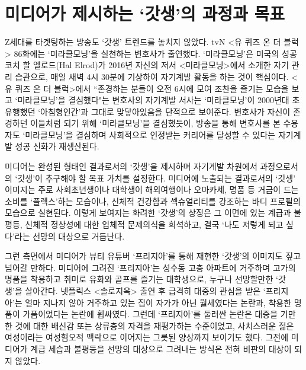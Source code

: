 \section*{미디어가 제시하는 `갓생'의 과정과 목표}

Z세대를 타겟팅하는 방송도 `갓생' 트렌드를 놓치지 않았다. tvN <유 퀴즈 온 더 블럭> 86화에는 `미라클모닝'을 실천하는 변호사가 출연했다. `미라클모닝'은 미국의 성공 코치 할 엘로드(Hal Elrod)가 2016년 자신의 저서 <미라클모닝>에서 소개한 자기 관리 습관으로, 매일 새벽 4시 30분에 기상하여 자기계발 활동을 하는 것이 핵심이다. <유 퀴즈 온 더 블럭>에서 ``존경하는 분들이 오전 6시에 모여 조찬을 즐기는 모습을 보고 `미라클모닝'을 결심했다"는 변호사의 자기계발 서사는 `미라클모닝'이 2000년대 초 유행했던 `아침형인간'과 그대로 맞닿아있음을 단적으로 보여준다. 변호사가 자신이 존경하던 이들처럼 되기 위해 `미라클모닝'을 결심했듯이, 방송을 통해 변호사를 본 수용자도 `미라클모닝'을 결심하며 사회적으로 인정받는 커리어를 달성할 수 있다는 자기계발 성공 신화가 재생산된다.

미디어는 완성된 형태인 결과로서의 `갓생'을 제시하며 자기계발 차원에서 과정으로서의 `갓생'이 추구해야 할 목표 가치를 설정한다. 미디어에 노출되는 결과로서의 `갓생' 이미지는 주로 사회초년생이나 대학생이 해외여행이나 오마카세, 명품 등 거금이 드는 소비를 `플렉스'하는 모습이나, 신체적 건강함과 섹슈얼리티를 강조하는 바디 프로필의 모습으로 실현된다. 이렇게 보여지는 화려한 `갓생'의 상징은 그 이면에 있는 계급과 불평등, 신체적 정상성에 대한 입체적 문제의식을 희석하고, 결국 `나도 저렇게 되고 싶다'라는 선망의 대상으로 거듭난다.

그런 측면에서 미디어가 뷰티 유튜버 `프리지아'를 통해 재현한 `갓생'의 이미지도 짚고 넘어갈 만하다. 미디어에 그려진 `프리지아'는 성수동 고층 아파트에 거주하며 고가의 명품을 착용하고 취미로 유화와 골프를 즐기는 대학생으로, 누구나 선망할만한 `갓생'을 살아간다. 넷플릭스 <솔로지옥> 출연 후 급격히 대중의 관심을 받은 `프리지아'는 얼마 지나지 않아 거주하고 있는 집이 자가가 아닌 월세였다는 논란과, 착용한 명품이 가품이었다는 논란에 휩싸였다. 그런데 `프리지아'를 둘러싼 논란은 대중을 기만한 것에 대한 배신감 또는 상류층의 자격을 재평가하는 수준이었고, 사치스러운 젊은 여성이라는 여성혐오적 맥락으로 이어지는 그릇된 양상까지 보이기도 했다. 그전에 미디어가 계급 세습과 불평등을 선망의 대상으로 그려내는 방식은 전혀 비판의 대상이 되지 않았다.

